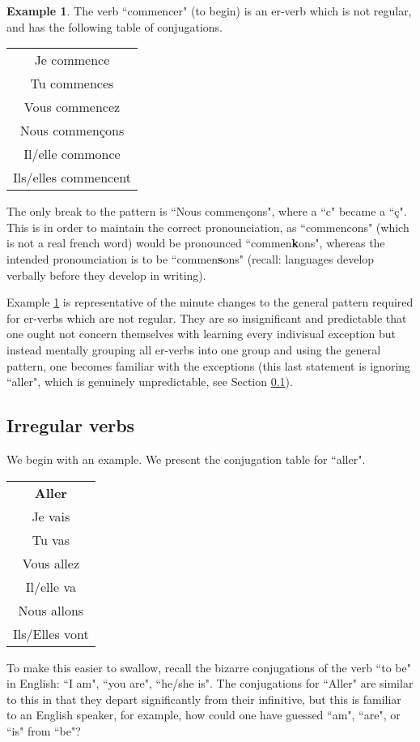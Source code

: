 \documentclass[12pt]{article}
\theoremstyle{plain}
\theoremstyle{definition}
\newtheorem{example}[thm]{Example}
\begin{document}
	\begin{example}\label{ex:irregular_er}
		The verb ``commencer" (to begin) is an er-verb which is not regular, and has the following table of conjugations.
		\begin{center}
			\begin{tabular}{|c|}
				\hline
				Je commence\\
				Tu commences\\
				Vous commencez\\
				Nous commençons\\
				Il/elle commonce\\
				Ils/elles commencent\\
				\hline
				\end{tabular}
			\end{center}
		The only break to the pattern is ``Nous commençons", where a ``c" became a ``ç". This is in order to maintain the correct pronounciation, as ``commencons" (which is not a real french word) would be pronounced ``commen\textbf{k}ons", whereas the intended pronounciation is to be ``commen\textbf{s}ons" (recall: languages develop verbally before they develop in writing).
		\end{example}
	Example \ref{ex:irregular_er} is representative of the minute changes to the general pattern required for er-verbs which are not regular. They are so insignificant and predictable that one ought not concern themselves with learning every indivisual exception but instead mentally grouping all er-verbs into one group and using the general pattern, one becomes familiar with the exceptions (this last statement is ignoring ``aller", which is genuinely unpredictable, see Section \ref{sec:irregular}).
	
	\subsection{Irregular verbs}\label{sec:irregular}
	We begin with an example. We present the conjugation table for ``aller".
	\begin{center}
		\begin{tabular}{|c|}
			\hline
			\textbf{Aller}\\
			Je vais\\
			Tu vas\\
			Vous allez\\
			Il/elle va\\
			Nous allons\\
			Ils/Elles vont\\
			\hline
		\end{tabular}
	\end{center}
	To make this easier to swallow, recall the bizarre conjugations of the verb ``to be" in English: ``I am", ``you are", ``he/she is". The conjugations for ``Aller" are similar to this in that they depart significantly from their infinitive, but this is familiar to an English speaker, for example, how could one have guessed ``am", ``are", or ``is" from ``be"?
	
\end{document}
